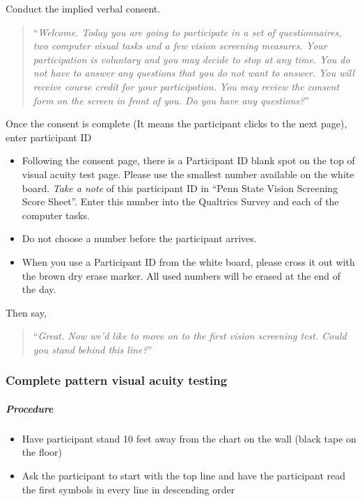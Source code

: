 \documentclass[]{article}
\providecommand{\tightlist}{%
  \setlength{\itemsep}{0pt}\setlength{\parskip}{0pt}}
\let\oldsubparagraph\subparagraph
\renewcommand{\subparagraph}[1]{\oldsubparagraph{#1}\mbox{}}
\begin{document}
Conduct the implied verbal consent.

\begin{quote}
``\emph{Welcome. Today you are going to participate in a set of
questionnaires, two computer visual tasks and a few vision screening
measures. Your participation is voluntary and you may decide to stop at
any time. You do not have to answer any questions that you do not want
to answer. You will receive course credit for your participation. You
may review the consent form on the screen in front of you. Do you have
any questions?}''
\end{quote}

Once the consent is complete (It means the participant clicks to the
next page), enter participant ID

\begin{itemize}
\item
  Following the consent page, there is a Participant ID blank spot on
  the top of visual acuity test page. Please use the smallest number
  available on the white board. \emph{Take a note} of this participant
  ID in ``Penn State Vision Screening Score Sheet''. Enter this number
  into the Qualtrics Survey and each of the computer tasks.
\item
  Do not choose a number before the participant arrives.
\item
  When you use a Participant ID from the white board, please cross it
  out with the brown dry erase marker. All used numbers will be erased
  at the end of the day.
\end{itemize}

Then say,

\begin{quote}
``\emph{Great. Now we'd like to move on to the first vision screening
test. Could you stand behind this line?}''
\end{quote}

\subsubsection{Complete pattern visual acuity
testing}\label{complete-pattern-visual-acuity-testing}

\subparagraph{Procedure}\label{procedure}

\begin{itemize}
\tightlist
\item
  Have participant stand 10 feet away from the chart on the wall (black
  tape on the floor)
\item
  Ask the participant to start with the top line and have the
  participant read the first symbols in every line in descending order
\end{itemize}
\end{document}
